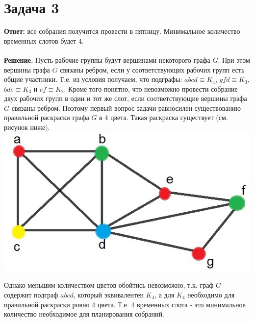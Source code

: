 \documentclass{article}
\begin{document}
\section*{Задача 3}
{\bf Ответ:} все собрания получится провести в пятницу. Минимальное количество временных слотов будет 4.
\\
\\
{\bf Решение.} Пусть рабочие группы будут вершинами некоторого графа $G$. При этом вершины графа $G$ связаны ребром, если у соответствующих рабочих групп есть общие участники. Т.е. из условия получаем, что подграфы: $abcd\equiv K_4$, $gfd\equiv K_3$, $bde\equiv K_3$ и $ef\equiv K_2$. Кроме того понятно, что невозможно провести собрание двух рабочих групп в один и тот же слот, если соответствующие вершины графа $G$ связаны ребром. Поэтому первый вопрос задачи равносилен существованию правильной раскраски графа $G$ в 4 цвета. Такая раскраска существует (см. рисунок ниже).
\\
{\includegraphics[scale=0.6]{img/img1.jpg}}
\par
Однако меньшим количеством цветов обойтись невозможно, т.к. граф $G$ содержит подграф $abcd$, который эквивалентен $K_4$, а для $K_4$ необходимо для правильной раскраски ровно 4 цвета. Т.е. 4 временных слота - это минимальное количество необходимое для планирования собраний.
\end{document}
